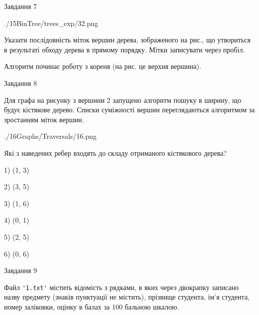 \documentclass[12pt, ukrainian]{article}
\def\code#1{\Verb!#1!}
\begin{document}
{\vspace{10mm}\par

\newpage
\begin{minipage}[t]{9.7cm}
               
{\begin{center}Завдання {7}\end{center}}
\vspace{-6mm}

\begin{center}
	{./15BinTree/trees_exp/32.png}
\end{center}
Указати послідовність міток вершин дерева, зображеного на рис., що утвориться в результаті обходу дерева в прямому порядку. Мітки записувати через пробіл.\par Алгоритм починає роботу з кореня (на рис. це верхня вершина).\par

\end{minipage}
\vline \hspace{8mm}
\begin{minipage}[t]{8.0cm}
               
{\begin{center}Завдання {8}\end{center}}
\vspace{-6mm}
Для графа на рисунку з вершини 2 запущено алгоритм пошуку в ширину, що будує кістякове дерево. Списки суміжності вершин переглядаються алгоритмом за зростанням міток вершин.\par
\begin{center}
	{./16Graphs/Traversals/16.png}
\end{center}
\par Які з наведених ребер входять до складу отриманого кістякового дерева?\par
1) (1, 3)\par
2) (3, 5)\par
3) (1, 6)\par
4) (0, 1)\par
5) (2, 5)\par
6) (0, 6)\par
{\vskip 15pt} \par

\end{minipage}

               
{\begin{center}Завдання {9}\end{center}}
\vspace{-6mm}
Файл \code{'1.txt'} містить відомість з рядками, в яких через двокрапку записа\-но назву предмету (знаків пунктуації не містить), прізвище студента, ім'я студента, номер залі\-ков\-ки, оцінку в балах за 100 бальною шкалою.

}
\end{document}
